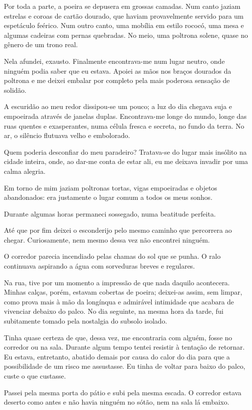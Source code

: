 Por toda a parte, a poeira se depusera em grossas camadas. Num canto jaziam estrelas e coroas de cartão dourado, que haviam provavelmente servido para um espetáculo feérico. Num outro canto, uma mobília em estilo rococó, uma mesa e algumas cadeiras com pernas quebradas. No meio, uma poltrona solene, quase no gênero de um trono real.

Nela afundei, exausto. Finalmente encontrava-me num lugar neutro, onde ninguém podia saber que eu estava. Apoiei as mãos nos braços dourados da poltrona e me deixei embalar por completo pela mais poderosa sensação de solidão.

A escuridão ao meu redor dissipou-se um pouco; a luz do dia chegava suja e empoeirada através de janelas duplas. Encontrava-me longe do mundo, longe das ruas quentes e exasperantes, numa célula fresca e secreta, no fundo da terra. No ar, o silêncio flutuava velho e embolorado.

Quem poderia desconfiar do meu paradeiro? Tratava-se do lugar mais insólito na cidade inteira, onde, ao dar-me conta de estar ali, eu me deixava invadir por uma calma alegria.

Em torno de mim jaziam poltronas tortas, vigas empoeiradas e objetos abandonados: era justamente o lugar comum a todos os meus sonhos. 

Durante algumas horas permaneci sossegado, numa beatitude perfeita.

Até que por fim deixei o esconderijo pelo mesmo caminho que percorrera ao chegar. Curiosamente, nem mesmo dessa vez não encontrei ninguém.

O corredor parecia incendiado pelas chamas do sol que se punha. O ralo continuava aspirando a água com sorveduras breves e regulares.

Na rua, tive por um momento a impressão de que nada daquilo acontecera. Minhas calças, porém, estavam cobertas de poeira; deixei-as assim, sem limpar, como prova mais à mão da longínqua e admirável intimidade que acabara de vivenciar debaixo do palco.
No dia seguinte, na mesma hora da tarde, fui subitamente tomado pela nostalgia do subsolo isolado.

Tinha quase certeza de que, dessa vez, me encontraria com alguém, fosse no corredor ou na sala. Durante algum tempo tentei resistir à tentação de retornar. Eu estava, entretanto, abatido demais por causa do calor do dia para que a possibilidade de um risco me assustasse. Eu tinha de voltar para baixo do palco, custe o que custasse.

Passei pela mesma porta do pátio e subi pela mesma escada. O corredor estava deserto como antes e não havia ninguém no sótão, nem na sala lá embaixo.

